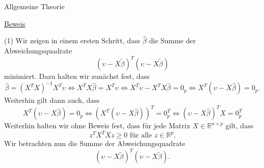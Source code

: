\documentclass[
  8pt,
  ignorenonframetext,
]{beamer}
\begin{document}
\begin{frame}{Allgemeine Theorie}
\protect\hypertarget{allgemeine-theorie-1}{}
\footnotesize

\underline{Beweis}

\noindent (1) Wir zeigen in einem ersten Schritt, dass \(\hat{\beta}\)
die Summe der Abweichungsquadrate \begin{equation}
(\upsilon-X\tilde{\beta})^T(\upsilon-X\tilde{\beta})
\end{equation} minimiert. Dazu halten wir zunächst fest, dass
\begin{equation}
\hat{\beta} = (X^TX)^{-1}X^T\upsilon
\Leftrightarrow
X^TX\hat{\beta} = X^T\upsilon
\Leftrightarrow
X^T\upsilon - X^TX\hat{\beta} = 0_p
\Leftrightarrow
X^T(\upsilon -   X\hat{\beta}) = 0_p.
\end{equation} Weiterhin gilt dann auch, dass \begin{equation}
X^T(\upsilon -  X\hat{\beta}) = 0_p
\Leftrightarrow
\left(X^T(\upsilon -  X\hat{\beta})\right)^T = 0_p^T
\Leftrightarrow
(\upsilon -  X\hat{\beta})^TX = 0_p^T
\end{equation} Weiterhin halten wir ohne Beweis fest, dass für jede
Matrix \(X \in \mathbb{R}^{n \times p}\) gilt, dass \begin{equation}
z^TX^TXz \ge 0 \mbox{ für alle } z \in \mathbb{R}^p.
\end{equation} Wir betrachten nun die Summe der Abweichungsquadrate
\begin{equation}
(\upsilon -  X\tilde{\beta})^T(\upsilon -  X\tilde{\beta}).
\end{equation}
\end{frame}
\end{document}
